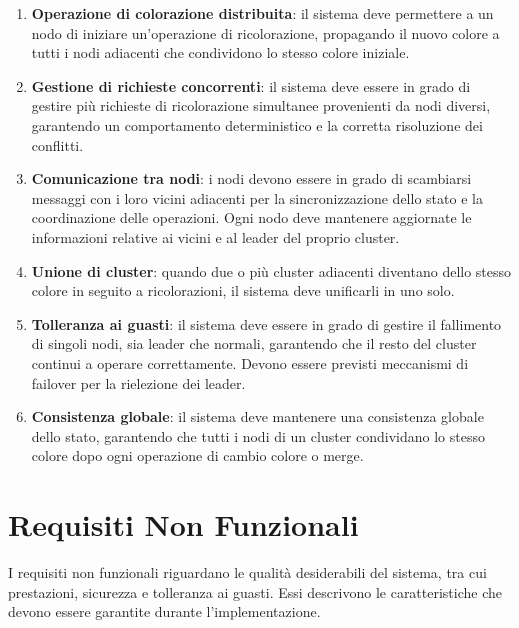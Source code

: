 \documentclass[12pt, a4paper]{report}
\begin{document}
\begin{enumerate}
    \item \textbf{Operazione di colorazione distribuita}: il sistema deve permettere a un nodo di iniziare un'operazione di ricolorazione, propagando il nuovo colore a tutti i nodi adiacenti che condividono lo stesso colore iniziale.

    \item \textbf{Gestione di richieste concorrenti}: il sistema deve essere in grado di gestire pi\`u richieste di ricolorazione simultanee provenienti da nodi diversi, garantendo un comportamento deterministico e la corretta risoluzione dei conflitti.

    \item \textbf{Comunicazione tra nodi}: i nodi devono essere in grado di scambiarsi messaggi con i loro vicini adiacenti per la sincronizzazione dello stato e la coordinazione delle operazioni. Ogni nodo deve mantenere aggiornate le informazioni relative ai vicini e al leader del proprio cluster.

    \item \textbf{Unione di cluster}: quando due o pi\`u cluster adiacenti diventano dello stesso colore in seguito a ricolorazioni, il sistema deve unificarli in uno solo.

    \item \textbf{Tolleranza ai guasti}: il sistema deve essere in grado di gestire il fallimento di singoli nodi, sia leader che normali, garantendo che il resto del cluster continui a operare correttamente. Devono essere previsti meccanismi di failover per la rielezione dei leader.

    \item \textbf{Consistenza globale}: il sistema deve mantenere una consistenza globale dello stato, garantendo che tutti i nodi di un cluster condividano lo stesso colore dopo ogni operazione di cambio colore o merge.
\end{enumerate}

\newpage
\section{Requisiti Non Funzionali}\label{sec:requisiti_non_funzionali}

I requisiti non funzionali riguardano le qualit\`a desiderabili del sistema, tra cui prestazioni, sicurezza e tolleranza ai guasti. Essi descrivono le caratteristiche che devono essere garantite durante l'implementazione.
\end{document}
